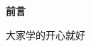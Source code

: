 
\frontmatter
\thispagestyle{empty}
\newpage
\begin{center}
	\textbf{\LARGE 前言}
\end{center}
大家学的开心就好



\frontmatter